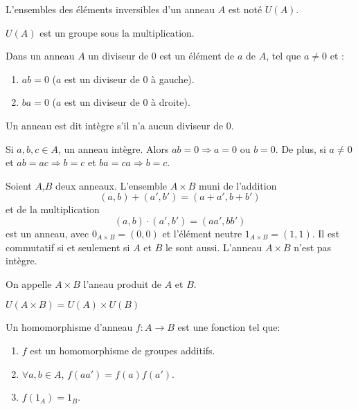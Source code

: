 \documentclass[12pt,a4paper]{article}
\begin{document}
\begin{flushleft}
\begin{mydef}
L'ensembles des éléments inversibles d'un anneau $A$ est noté $U(A)$. 
\end{mydef}

\begin{prop}
$U(A)$ est un groupe sous la multiplication.
\end{prop}

\begin{mydef}
Dans un anneau $A$ un diviseur de $0$ est un élément de $a$ de $A$, tel que $a \neq 0$ et :
\begin{enumerate}
\item $ab = 0$ ($a$ est un diviseur de $0$ à gauche).
\item $ba = 0$ ($a$ est un diviseur de $0$ à droite).
\end{enumerate}
\end{mydef}

\begin{mydef}
Un anneau est dit intègre s'il n'a aucun diviseur de $0$.
\end{mydef}

\begin{prop}
Si $a,b,c \in A$, un anneau intègre. Alors $ab = 0 \Rightarrow a=0$ ou $b=0$. De plus, si $a \neq 0$ et $ab = ac \Rightarrow b=c$ et $ba = ca \Rightarrow b = c.$
\end{prop}

\begin{prop}
Soient $A$,$B$ deux anneaux. L'ensemble $A \times B$ muni de l'addition $$ (a,b) + (a',b') = (a+a',b+b')$$ et de la multiplication $$(a,b) \cdot (a',b') = (aa',bb')$$ est un anneau, avec $0_{A \times B} = (0,0)$ et l'élément neutre $1_{A \times B} = (1,1)$. Il est commutatif si et seulement si $A$ et $B$ le sont aussi. L'anneau $A \times B$ n'est pas intègre.
\end{prop}

\begin{mydef}
On appelle $A \times B$ l'aneau produit de $A$ et $B$.
\end{mydef}

\begin{prop} 
$U(A \times B) = U(A) \times U(B) $
\end{prop}

\begin{mydef}
Un homomorphisme d'anneau $f:A\longrightarrow B$ est une fonction tel que:
\begin{enumerate}
\item $f$ est un homomorphisme de groupes additifs.
\item $\forall a,b \in A$, $f(aa')=f(a)f(a')$.
\item $f(1_A) = 1_B$.
\end{enumerate}
\end{mydef}


\end{flushleft}
\end{document}
